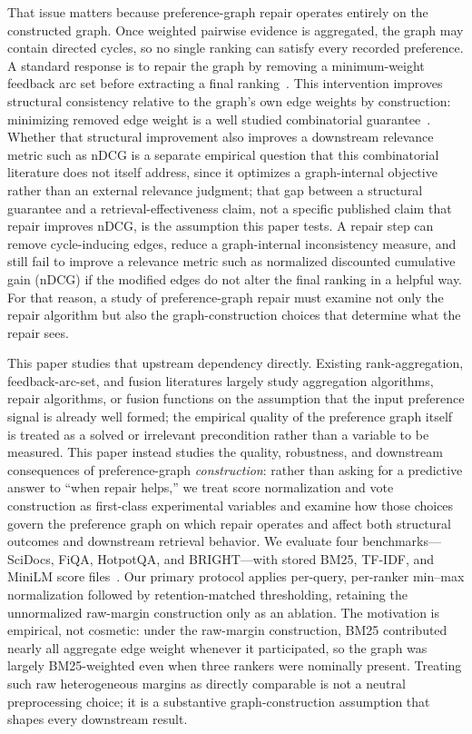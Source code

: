 \documentclass[manuscript,anonymous,review]{acmart}
\begin{document}
That issue matters because preference-graph repair operates entirely on the
constructed graph. Once weighted pairwise evidence is aggregated, the graph
may contain directed cycles, so no single ranking can satisfy every recorded
preference. A standard response is to repair the graph by removing a
minimum-weight feedback arc set before extracting a final ranking~\cite{ailon2008aggregating,kenyon2007fewerrors}.
This intervention improves structural consistency relative to the graph's own
edge weights by construction: minimizing removed edge weight is a well
studied combinatorial guarantee~\cite{ailon2008aggregating,kenyon2007fewerrors,dwork2001rank}.
Whether that structural improvement also improves a downstream relevance
metric such as nDCG is a separate empirical question that this combinatorial
literature does not itself address, since it optimizes a graph-internal
objective rather than an external relevance judgment; that gap between a
structural guarantee and a retrieval-effectiveness claim, not a specific
published claim that repair improves nDCG, is the assumption this paper
tests. A repair step can remove cycle-inducing edges, reduce a
graph-internal inconsistency measure, and still fail to improve a relevance
metric such as normalized discounted cumulative gain (nDCG) if the modified
edges do not alter the final ranking in a helpful way. For that reason, a
study of preference-graph repair must examine not only the repair algorithm
but also the graph-construction choices that determine what the repair sees.

This paper studies that upstream dependency directly. Existing
rank-aggregation, feedback-arc-set, and fusion literatures largely study
aggregation algorithms, repair algorithms, or fusion functions on the
assumption that the input preference signal is already well formed; the
empirical quality of the preference graph itself is treated as a solved or
irrelevant precondition rather than a variable to be measured. This paper
instead studies the quality, robustness, and downstream consequences of
preference-graph \emph{construction}: rather than asking for a predictive
answer to ``when repair helps,'' we treat score normalization and vote
construction as first-class experimental variables and examine how those
choices govern the preference graph on which repair operates and affect both
structural outcomes and downstream retrieval behavior. We evaluate four
benchmarks---SciDocs, FiQA, HotpotQA, and BRIGHT---with stored BM25, TF-IDF,
and MiniLM score files~\cite{cohan2020scidocs,maia2018fiqa,yang2018hotpotqa,su2024bright}.
Our primary protocol applies per-query, per-ranker min--max normalization
followed by retention-matched thresholding, retaining the unnormalized
raw-margin construction only as an ablation. The motivation is empirical, not
cosmetic: under the raw-margin construction, BM25 contributed nearly all
aggregate edge weight whenever it participated, so the graph was largely
BM25-weighted even when three rankers were nominally present. Treating such
raw heterogeneous margins as directly comparable is not a neutral
preprocessing choice; it is a substantive graph-construction assumption that
shapes every downstream result.
\end{document}
